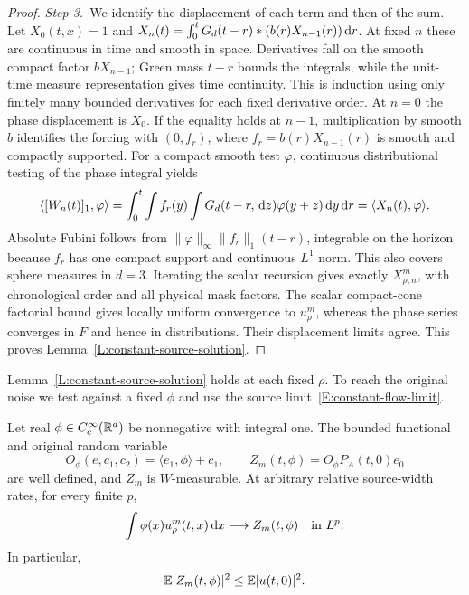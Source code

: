 \begin{proof}
  \medskip
  \noindent\textit{Step 3.~}We identify the displacement of each term and then
  of the sum.
  Let $X_0(t,x) = 1$ and $X_n(t) = \int_0^tG_d(t-r)*(b(r)X_{n-1}(r))\,\mathrm{d} r$. At
  fixed $n$ these are continuous in time and smooth in space. Derivatives fall
  on the smooth compact factor $bX_{n-1}$; Green mass $t-r$ bounds the
  integrals, while the unit-time measure representation gives time continuity.
  This is induction using only finitely many bounded derivatives for each fixed
  derivative order. At $n = 0$ the phase displacement is $X_0$. If the equality
  holds at $n-1$, multiplication by smooth $b$ identifies the forcing with
  $(0,f_r)$, where $f_r = b(r)X_{n-1}(r)$ is smooth and compactly supported. For
  a compact smooth test $\varphi$, continuous distributional testing of the
  phase integral yields
  \[
    \langle[W_n(t)]_1,\varphi\rangle
    =\int_0^t\int f_r(y)
    \int G_d(t-r,\,\mathrm{d} z)\varphi(y+z)\,\mathrm{d} y\,\mathrm{d} r
    =\langle X_n(t),\varphi\rangle.
  \]
  Absolute Fubini follows from $\|\varphi\|_\infty\|f_r\|_1(t-r)$, integrable on
  the horizon because $f_r$ has one compact support and continuous $L^1$ norm.
  This also covers sphere measures in $d = 3$. Iterating the scalar recursion
  gives exactly $X_{\rho,n}^m$, with chronological order and all physical mask
  factors. The scalar compact-cone factorial bound gives locally uniform
  convergence to $u_\rho^m$, whereas the phase series converges in $F$ and hence
  in distributions. Their displacement limits agree. This proves
  Lemma~\ref{L:constant-source-solution}.
\end{proof}

Lemma~\ref{L:constant-source-solution} holds at each fixed $\rho$. To reach
the original noise we test against a fixed $\phi$ and use the source
limit~\eqref{E:constant-flow-limit}.

\begin{proposition}
  \label{P:constant-raw-average}
  Let real $\phi \in C_c^\infty(\mathbb{R}^d)$ be nonnegative with integral one. The
  bounded functional and original random variable
  \begin{equation}\label{E:constant-raw-average}
    O_\phi(e,c_1,c_2)=\langle e_1,\phi\rangle+c_1,\qquad
    Z_m(t,\phi)=O_\phi P_A(t,0)e_0
  \end{equation}
  are well defined, and $Z_m$ is $W$-measurable. At arbitrary relative
  source-width rates, for every finite $p$,
  \begin{equation}\label{E:constant-tested-limit}
    \int\phi(x)u_\rho^m(t,x)\,\mathrm{d} x
    \longrightarrow Z_m(t,\phi)\quad\text{in }L^p.
  \end{equation}
  In particular,
  \begin{equation}\label{E:constant-original-point-transfer}
    \mathbb{E}|Z_m(t,\phi)|^2\le\mathbb{E}|u(t,0)|^2.
  \end{equation}
\end{proposition}


